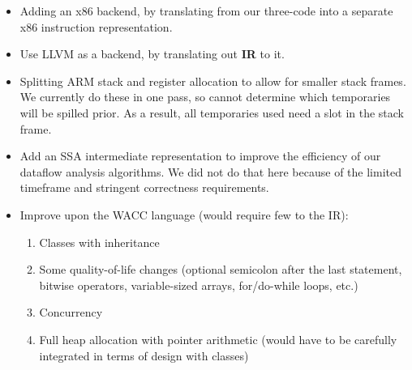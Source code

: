 \documentclass{article}
\newcommand{\keyword}[1]{\textbf{#1}}
\newcommand{\compitem}[1]{\begin{itemize}\setlength\itemsep{-0.5em}#1\end{itemize}}
\begin{document}
        \compitem{
            \item Adding an x86 backend, by translating from our three-code into a separate x86 instruction representation.
            \item Use LLVM as a backend, by translating out \keyword{IR} to it.
            \item Splitting ARM stack and register allocation to allow for smaller stack frames. We currently do these in one pass, so cannot determine which temporaries will be spilled prior. As a result, all temporaries used need a slot in the stack frame.
            \item Add an SSA intermediate representation to improve the efficiency of our dataflow analysis algorithms. We did not do that here because of the limited timeframe and stringent correctness requirements.
            \item Improve upon the WACC language (would require few to the IR):
                \begin{enumerate}
                    \item Classes with inheritance
                    \item Some quality-of-life changes (optional semicolon after the last statement, bitwise operators, variable-sized arrays, for/do-while loops, etc.)
                    \item Concurrency
                    \item Full heap allocation with pointer arithmetic (would have to be carefully integrated in terms of design with classes)
                \end{enumerate}
        }
\end{document}
